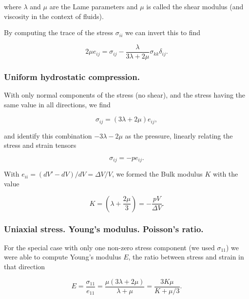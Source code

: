 where $\lambda$ and $\mu$ are the Lame parameters and $\mu$ is called the shear modulus (and viscosity in the context of fluids).

By computing the trace of the stress $\sigma_{ii}$ we can invert this to find

\begin{equation}\label{eqn:continuumElasticityReview:330}
2 \mu e_{ij} = \sigma_{ij} - \frac{\lambda}{3 \lambda + 2 \mu} \sigma_{kk} \delta_{ij}.
\end{equation}

\subsubsection{Uniform hydrostatic compression.}

With only normal components of the stress (no shear), and the stress having the same value in all directions, we find

\begin{equation}\label{eqn:continuumElasticityReview:350}
\sigma_{ij} = ( 3 \lambda + 2 \mu ) e_{ij},
\end{equation}

and identify this combination $-3 \lambda - 2 \mu$ as the pressure, linearly relating the stress and strain tensors

\begin{equation}\label{eqn:continuumElasticityReview:370}
\sigma_{ij} = -p e_{ij}.
\end{equation}

With $e_{ii} = (dV' - dV)/dV = \Delta V/V$, we formed the Bulk modulus $K$ with the value

\begin{equation}\label{eqn:continuumElasticityReview:390}
K = \left( \lambda + \frac{2 \mu}{3} \right) = -\frac{p V}{\Delta V}.
\end{equation}

\subsubsection{Uniaxial stress.  Young's modulus.  Poisson's ratio.}

For the special case with only one non-zero stress component (we used $\sigma_{11}$) we were able to compute Young's modulus $E$, the ratio between stress and strain in that direction

\begin{equation}\label{eqn:continuumElasticityReview:410}
E = \frac{\sigma_{11}}{e_{11}} = \frac{\mu(3 \lambda + 2 \mu)}{\lambda + \mu }  = \frac{3 K \mu}{K + \mu/3}.
\end{equation}

